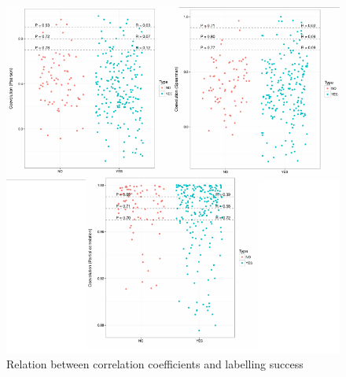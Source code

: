 \documentclass[11pt]{article}
\begin{document}
\begin{figure}[t]
	\includegraphics[width=1.0\textwidth]{graphics3}
	\enspace \caption{Relation between correlation coefficients and labelling success}
\end{figure}


	
\end{document}
